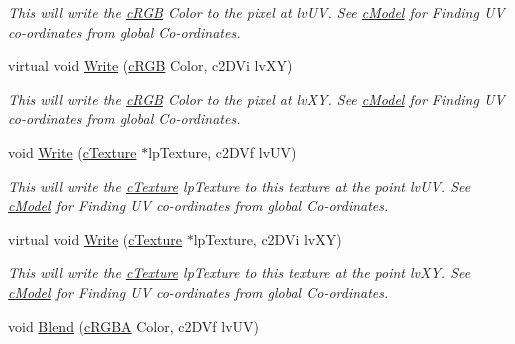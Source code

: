 \begin{DoxyCompactItemize}
\begin{DoxyCompactList}\small\item\em This will write the \hyperlink{classc_r_g_b}{cRGB} Color to the pixel at lvUV. See \hyperlink{classc_model}{cModel} for Finding UV co-\/ordinates from global Co-\/ordinates. \end{DoxyCompactList}\item 
\hypertarget{classc_texture_ae89a42bdddbcb9aa974cbc81646978f6}{
virtual void \hyperlink{classc_texture_ae89a42bdddbcb9aa974cbc81646978f6}{Write} (\hyperlink{classc_r_g_b}{cRGB} Color, c2DVi lvXY)}
\label{classc_texture_ae89a42bdddbcb9aa974cbc81646978f6}

\begin{DoxyCompactList}\small\item\em This will write the \hyperlink{classc_r_g_b}{cRGB} Color to the pixel at lvXY. See \hyperlink{classc_model}{cModel} for Finding UV co-\/ordinates from global Co-\/ordinates. \end{DoxyCompactList}\item 
\hypertarget{classc_texture_a7029b211330e3b8a81dba270d8fbadee}{
void \hyperlink{classc_texture_a7029b211330e3b8a81dba270d8fbadee}{Write} (\hyperlink{classc_texture}{cTexture} $\ast$lpTexture, c2DVf lvUV)}
\label{classc_texture_a7029b211330e3b8a81dba270d8fbadee}

\begin{DoxyCompactList}\small\item\em This will write the \hyperlink{classc_texture}{cTexture} lpTexture to this texture at the point lvUV. See \hyperlink{classc_model}{cModel} for Finding UV co-\/ordinates from global Co-\/ordinates. \end{DoxyCompactList}\item 
\hypertarget{classc_texture_a0b7d59af832ec81588d77895e364f93c}{
virtual void \hyperlink{classc_texture_a0b7d59af832ec81588d77895e364f93c}{Write} (\hyperlink{classc_texture}{cTexture} $\ast$lpTexture, c2DVi lvXY)}
\label{classc_texture_a0b7d59af832ec81588d77895e364f93c}

\begin{DoxyCompactList}\small\item\em This will write the \hyperlink{classc_texture}{cTexture} lpTexture to this texture at the point lvXY. See \hyperlink{classc_model}{cModel} for Finding UV co-\/ordinates from global Co-\/ordinates. \end{DoxyCompactList}\item 
\hypertarget{classc_texture_a031c748e8cf4f03e960015d10dac1c4f}{
void \hyperlink{classc_texture_a031c748e8cf4f03e960015d10dac1c4f}{Blend} (\hyperlink{classc_r_g_b_a}{cRGBA} Color, c2DVf lvUV)}
\label{classc_texture_a031c748e8cf4f03e960015d10dac1c4f}


\end{DoxyCompactItemize}

